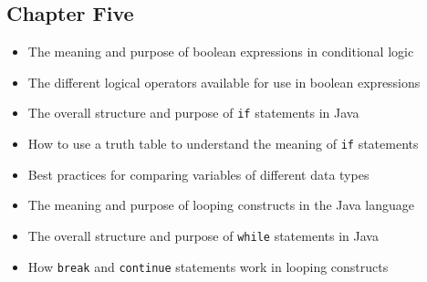 \documentclass[11pt]{article}
\begin{document}
\vspace*{-.25in}
\subsection*{Chapter Five}
\vspace*{-.1in}

\begin{itemize}

  \itemsep -.015in
  \item The meaning and purpose of boolean expressions in conditional logic
  \item The different logical operators available for use in boolean expressions
  \item The overall structure and purpose of {\tt if} statements in Java
  \item How to use a truth table to understand the meaning of {\tt if} statements
  \item Best practices for comparing variables of different data types
  \item The meaning and purpose of looping constructs in the Java language
  \item The overall structure and purpose of {\tt while} statements in Java
  \item How {\tt break} and {\tt continue} statements work in looping constructs

\end{itemize}
\end{document}
